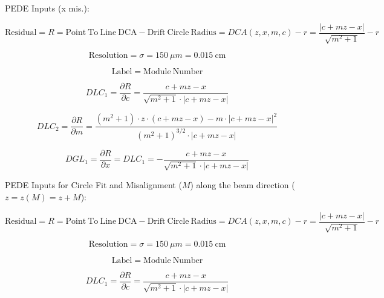 \documentclass[a4paper,11pt]{article}
\begin{document}
\clearpage

PEDE Inputs (x mis.): 


\begin{equation}	
\mathrm{Residual}= R =\mathrm{Point \ To \ Line \ DCA} - \mathrm{Drift \ Circle \ Radius} = DCA(z,x,m,c) - r = \frac{ |c+mz-x| }  { \sqrt{m^2+1} } -r
\end{equation}


\begin{equation}	
\mathrm{Resolution} = \sigma = 150 \ \mu m = 0.015 \ \mathrm{cm}
\end{equation}

\begin{equation}	
\mathrm{Label}= \mathrm{Module \ Number}
\end{equation}

\begin{equation}
DLC_1 = \frac{\partial R}{\partial c} = \frac{ c+mz-x }  { \sqrt{m^2+1} \cdot |c+mz-x| }
\end{equation}

\begin{equation}
DLC_2 = \frac{ \partial R}{\partial m} = \frac{ (m^2+1)\cdot z\cdot(c+mz-x) - m\cdot |c+mz-x|^2 }{ (m^2+1)^{3/2} \cdot |c+mz-x|  }
\end{equation}

\begin{equation}	
DGL_1 = \frac{\partial R}{\partial x} = DLC_1 = - \frac{ c+mz-x }  { \sqrt{m^2+1} \cdot |c+mz-x| }
\end{equation}

\clearpage


PEDE Inputs for Circle Fit and Misalignment ($M$) along the beam direction ($z=z(M)=z+M$):


\begin{equation}	
\mathrm{Residual}= R =\mathrm{Point \ To \ Line \ DCA} - \mathrm{Drift \ Circle \ Radius} = DCA(z,x,m,c) - r = \frac{ |c+mz-x| }  { \sqrt{m^2+1} } -r
\end{equation}


\begin{equation}	
\mathrm{Resolution} = \sigma = 150 \ \mu m = 0.015 \ \mathrm{cm}
\end{equation}

\begin{equation}	
\mathrm{Label}= \mathrm{Module \ Number}
\end{equation}

\begin{equation}
DLC_1 = \frac{\partial R}{\partial c} = \frac{ c+mz-x }  { \sqrt{m^2+1} \cdot |c+mz-x| }
\end{equation}
\end{document}
